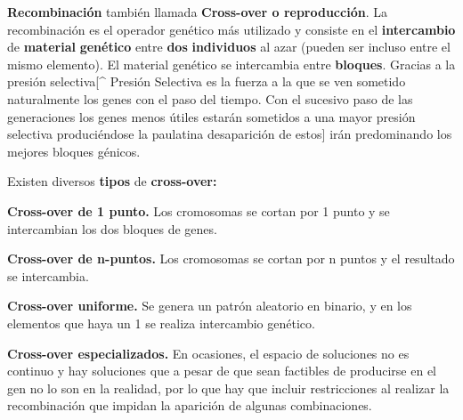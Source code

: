 \documentclass[
  a4paper,
  DIV=11,
  numbers=noendperiod]{scrreprt}
\begin{document}
\textbf{Recombinación} también llamada \textbf{Cross-over o
reproducción}. La recombinación es el operador genético más utilizado y
consiste en el \textbf{intercambio} de \textbf{material}
\textbf{genético} entre \textbf{dos} \textbf{individuos} al azar (pueden
ser incluso entre el mismo elemento). El material genético se
intercambia entre \textbf{bloques}. Gracias a la presión
selectiva{[}\^{} Presión Selectiva es la fuerza a la que se ven sometido
naturalmente los genes con el paso del tiempo. Con el sucesivo paso de
las generaciones los genes menos útiles estarán sometidos a una mayor
presión selectiva produciéndose la paulatina desaparición de estos{]}
irán predominando los mejores bloques génicos.

Existen diversos \textbf{tipos} de \textbf{cross-over:}

\textbf{Cross-over de 1 punto.} Los cromosomas se cortan por 1 punto y
se intercambian los dos bloques de genes.

\textbf{Cross-over de n-puntos.} Los cromosomas se cortan por n puntos y
el resultado se intercambia.

\textbf{Cross-over uniforme.} Se genera un patrón aleatorio en binario,
y en los elementos que haya un 1 se realiza intercambio genético.

\textbf{Cross-over especializados.} En ocasiones, el espacio de
soluciones no es continuo y hay soluciones que a pesar de que sean
factibles de producirse en el gen no lo son en la realidad, por lo que
hay que incluir restricciones al realizar la recombinación que impidan
la aparición de algunas combinaciones.
\end{document}
